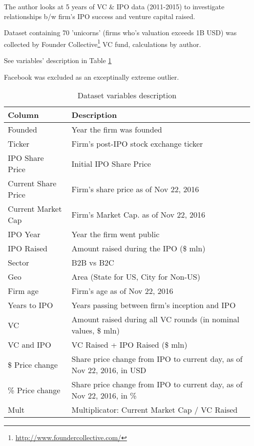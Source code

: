 The author looks at 5 years of VC \& IPO data (2011-2015) to investigate relationships b/w firm's IPO success and venture capital raised.

Dataset containing 70 'unicorns' (firms who's valuation exceeds 1B USD) was collected by Founder Collective\footnote{\url{http://www.foundercollective.com/}} VC fund, calculations by author.

See variables' description in Table \ref{tab:descr}

Facebook was excluded as an exceptinally extreme outlier.

\begin{table}[bp!]
    \centering
    \caption{Dataset variables description}
    \label{tab:descr}
    \begin{tabular}{ll}
    \textbf{Column}     & \textbf{Description}                                                   \\ \hline
    Founded             & Year the firm was founded                                              \\
    Ticker              & Firm's post-IPO stock exchange ticker                                  \\
    IPO Share Price     & Initial IPO Share Price                                                \\
    Current Share Price & Firm's share price as of Nov 22, 2016                                  \\
    Current Market Cap  & Firm's Market Cap. as of Nov 22, 2016                                  \\
    IPO Year            & Year the firm went public                                              \\
    IPO Raised          & Amount raised during the IPO (\$ mln)                                  \\
    Sector              & B2B vs B2C                                                             \\
    Geo                 & Area (State for US, City for Non-US)                                   \\
    Firm age            & Firm's age as of Nov 22, 2016                                          \\
    Years to IPO        & Years passing between firm's inception and IPO                         \\
    VC                  & Amount raised during all VC rounds (in nominal values, \$ mln)         \\
    VC and IPO          & VC Raised + IPO Raised (\$ mln)                                        \\
    \$ Price change     & Share price change from IPO to current day, as of Nov 22, 2016, in USD \\
    \% Price change     & Share price change from IPO to current day, as of Nov 22, 2016, in \%  \\
    Mult                & Multiplicator: Current Market Cap / VC Raised                         
    \end{tabular}
\end{table}



